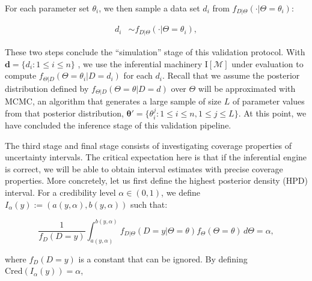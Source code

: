 \documentclass[oneside]{article}
\begin{document}
For each parameter set $\theta_i$, we then sample a data set
$d_i$ from
$f_{D|\Theta}(\cdot|\Theta=\theta_i)$:

\vspace{-1cm}
\begin{align*}
   d_i & \sim  f_{D|\Theta}(\cdot | \Theta=\theta_i),
\end{align*}

These two steps conclude the ``simulation'' stage of this validation protocol.
With
$\boldsymbol{d} = \{d_i: 1 \leq i \leq n\}$
, we use the inferential machinery $\text{I}[\mathcal{M}]$ under
evaluation to compute
$f_{\Theta|D}(\Theta=\theta_i|D=d_i)$ for each $d_i$.
Recall that we assume the posterior distribution defined by $f_{\Theta|D}(\Theta=\theta|D=d)$ over $\Theta$ will be approximated with MCMC, an algorithm that generates a large sample of size $L$ of parameter values from that posterior distribution, $\boldsymbol{\theta}' = \{ \theta_i^j: 1 \leq i \leq n, 1 \leq j \leq L\}$.
At this point, we have concluded the inference stage of this validation pipeline.

The third stage and final stage consists of investigating coverage properties of uncertainty intervals.
The critical expectation here is that if the inferential engine is correct, we will be able to obtain interval estimates with precise coverage properties.
More concretely, let us first define the highest posterior density (HPD) interval.
For a credibility level $\alpha \in (0, 1)$, we define $I_\alpha(y) := (a(y, \alpha), b(y, \alpha))$
such that:


\begin{equation*}
  \frac{1}{f_D(D=y)} \int_{a(y, \alpha)}^{b(y,\alpha)} f_{D|\Theta}(D=y | \Theta=\theta)f_\Theta(\Theta=\theta)\, d\Theta = \alpha,
\end{equation*}

\noindent where
$f_D(D=y)$
is a constant that can be ignored.
By defining $\text{Cred}(I_\alpha(y)) = \alpha$,
\end{document}
